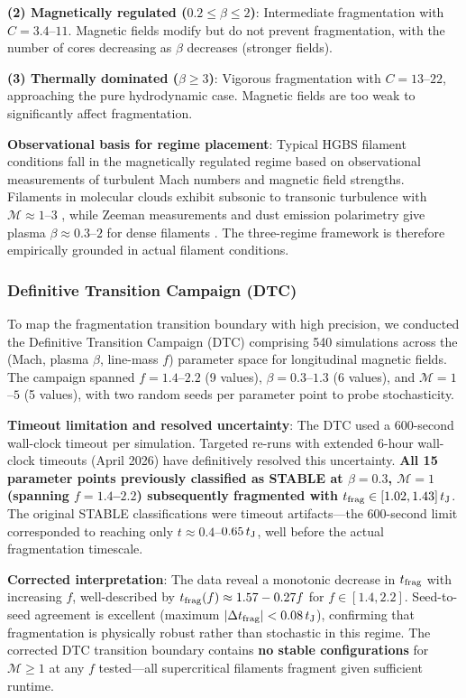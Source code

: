 \documentclass[twocolumn]{mnras}
\begin{document}
\textbf{(2) Magnetically regulated ($0.2 \leq \beta \leq 2$)}: Intermediate fragmentation with $C = 3.4$--$11$. Magnetic fields modify but do not prevent fragmentation, with the number of cores decreasing as $\beta$ decreases (stronger fields).

\textbf{(3) Thermally dominated ($\beta \geq 3$)}: Vigorous fragmentation with $C = 13$--$22$, approaching the pure hydrodynamic case. Magnetic fields are too weak to significantly affect fragmentation.

\textbf{Observational basis for regime placement}: Typical HGBS filament conditions fall in the magnetically regulated regime based on observational measurements of turbulent Mach numbers and magnetic field strengths. Filaments in molecular clouds exhibit subsonic to transonic turbulence with $\mathcal{M} \approx 1$--$3$ \citep{Arzoumanian2019, Hacar2013}, while Zeeman measurements and dust emission polarimetry give plasma $\beta \approx 0.3$--$2$ for dense filaments \citep{Planck2016, Pattle2018}. The three-regime framework is therefore empirically grounded in actual filament conditions.

\subsubsection{Definitive Transition Campaign (DTC)}
\label{sec:dtc}

To map the fragmentation transition boundary with high precision, we conducted the Definitive Transition Campaign (DTC) comprising 540 simulations across the (Mach, plasma $\beta$, line-mass $f$) parameter space for longitudinal magnetic fields. The campaign spanned $f = 1.4$--$2.2$ (9 values), $\beta = 0.3$--$1.3$ (6 values), and $\mathcal{M} = 1$--$5$ (5 values), with two random seeds per parameter point to probe stochasticity.

\textbf{Timeout limitation and resolved uncertainty}: The DTC used a 600-second wall-clock timeout per simulation. Targeted re-runs with extended 6-hour wall-clock timeouts (April 2026) have definitively resolved this uncertainty. \textbf{All 15 parameter points previously classified as STABLE at $\beta = 0.3$, $\mathcal{M} = 1$ (spanning $f = 1.4$--$2.2$) subsequently fragmented with $t_{\rm frag} \in [1.02, 1.43]\,t_{\rm J}$}. The original STABLE classifications were timeout artifacts—the 600-second limit corresponded to reaching only $t \approx 0.4$--$0.65\,t_{\rm J}$, well before the actual fragmentation timescale.

\textbf{Corrected interpretation}: The data reveal a monotonic decrease in $t_{\rm frag}$ with increasing $f$, well-described by $t_{\rm frag}(f) \approx 1.57 - 0.27f$ for $f \in [1.4, 2.2]$. Seed-to-seed agreement is excellent (maximum $|\Delta t_{\rm frag}| < 0.08\,t_{\rm J}$), confirming that fragmentation is physically robust rather than stochastic in this regime. The corrected DTC transition boundary contains \textbf{no stable configurations} for $\mathcal{M} \geq 1$ at any $f$ tested—all supercritical filaments fragment given sufficient runtime.
\end{document}
